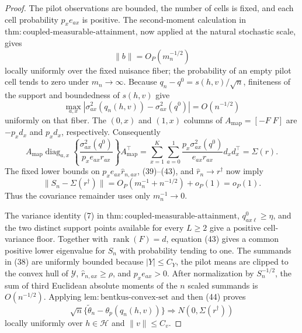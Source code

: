 \documentclass{article}
\begin{document}
\begin{proof}
The pilot observations are bounded, the number of cells is fixed, and each cell probability \(p_xe_{ax}\) is positive. The second-moment calculation in \(\mathrm{thm:coupled\text{-}measurable\text{-}attainment}\), now applied at the natural stochastic scale, gives
\[
\lVert b\rVert=O_P(m_n^{-1/2})
\tag{41}
\]
locally uniformly over the fixed nuisance fiber; the probability of an empty pilot cell tends to zero under \(m_n\to\infty\). Because \(q_n-q^0=s(h,v)/\sqrt n\), finiteness of the support and boundedness of \(s(h,v)\) give
\[
\max_{a,x}|\sigma^2_{ax}(q_n(h,v))-\sigma^2_{ax}(q^0)|=O(n^{-1/2})
\tag{42}
\]
uniformly on that fiber. The \((0,x)\) and \((1,x)\) columns of \(A_{\mathrm{map}}=[-F\;F]\) are \(-p_xd_x\) and \(p_xd_x\), respectively. Consequently
\[
A_{\mathrm{map}}\operatorname{diag}_{a,x}\left\{
\frac{\sigma^2_{ax}(q^0)}{p_xe_{ax}r_{ax}}
\right\}A_{\mathrm{map}}^\top
=\sum_{x=1}^K\sum_{a=0}^1
\frac{p_x\sigma^2_{ax}(q^0)}{e_{ax}r_{ax}}d_xd_x^\top
=\Sigma(r).
\tag{43}
\]
The fixed lower bounds on \(p_xe_{ax}\widehat r_{n,ax}\), (39)--(43), and \(\widehat r_n\to r^\dagger\) now imply
\[
\lVert S_n-\Sigma(r^\dagger)\rVert
=O_P(m_n^{-1}+n^{-1/2})+o_P(1)=o_P(1).
\tag{44}
\]
Thus the covariance remainder uses only \(m_n^{-1}\to0\).

The variance identity (7) in \(\mathrm{thm:coupled\text{-}measurable\text{-}attainment}\), \(q^0_{ax\ell}\ge\eta\), and the two distinct support points available for every \(L\ge2\) give a positive cell-variance floor. Together with \(\operatorname{rank}(F)=d\), equation (43) gives a common positive lower eigenvalue for \(S_n\) with probability tending to one. The summands in (38) are uniformly bounded because \(|Y|\le C_Y\), the pilot means are clipped to the convex hull of \(\mathcal Y\), \(\widehat r_{n,ax}\ge\rho\), and \(p_xe_{ax}>0\). After normalization by \(S_n^{-1/2}\), the sum of third Euclidean absolute moments of the \(n\) scaled summands is \(O(n^{-1/2})\). Applying \(\mathrm{lem:bentkus\text{-}convex\text{-}set}\) and then (44) proves
\[
\sqrt n\{\widetilde\theta_n-\theta_p(q_n(h,v))\}
\Rightarrow N(0,\Sigma(r^\dagger))
\tag{45}
\]
locally uniformly over \(h\in\mathcal H\) and \(\lVert v\rVert\le C_v\).


\end{proof}
\end{document}
